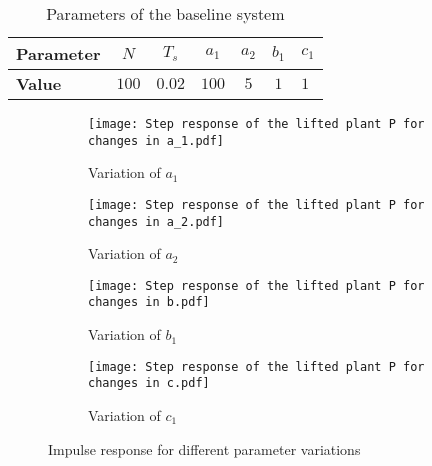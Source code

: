 \begin{table}[h]
    \renewcommand{\arraystretch}{1.3}
    \begin{tabularx}{1\textwidth}{@{}lcccccX@{}}
        \toprule
        \textbf{Parameter} 	& $N$  	&  $T_s$ & $a_1$ & $a_2$ & $b_1$ & $c_1$ \\ \midrule
        \textbf{Value} 		& $100$ &  $0.02$ & $100$ & $5$ & $1$ & $1$ \\
        \bottomrule
    \end{tabularx}
    \caption{Parameters of the baseline system}
\end{table}

\begin{figure}
    \centering
    \begin{subfigure}[t]{0.495\textwidth}
        \centering
        \texttt{[image: Step response of the lifted plant P for changes in a\_1.pdf]}
        \caption{Variation of $a_1$}
    \end{subfigure}
    \hfill
    \begin{subfigure}[t]{0.495\textwidth}
        \centering
        \texttt{[image: Step response of the lifted plant P for changes in a\_2.pdf]}
        \caption{Variation of $a_2$}
    \end{subfigure}
    \hfill
    \begin{subfigure}[t]{0.495\textwidth}
        \centering
        \texttt{[image: Step response of the lifted plant P for changes in b.pdf]}
        \caption{Variation of $b_1$}
    \end{subfigure}
    \hfill
    \begin{subfigure}[t]{0.495\textwidth}
        \centering
        \texttt{[image: Step response of the lifted plant P for changes in c.pdf]}
        \caption{Variation of $c_1$}
    \end{subfigure}
    \caption[Parameter Variations -- Impulse Response]{Impulse response for different parameter variations}
    \label{fig:app_stepres}
\end{figure}

